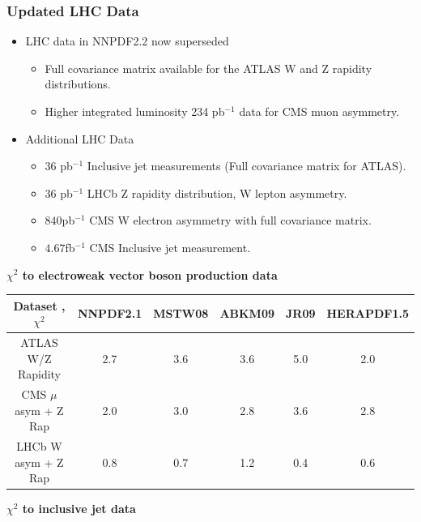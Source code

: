 \documentclass[10pt]{beamer}
\newcommand{\vso}{\vskip15pt}
\begin{document}
\begin{frame}
\frametitle{Updated LHC Data}
\begin{itemize}
\item<1-> LHC data in NNPDF2.2 now superseded
 \begin{itemize}
 \item<1-> Full covariance matrix available for the ATLAS W and Z rapidity distributions.
  \item<1-> Higher integrated luminosity 234 pb$^{-1}$ data for CMS muon asymmetry.
\end{itemize}
\end{itemize}

\begin{itemize}
\item<1-> Additional LHC Data
\begin{itemize}
\item<1-> $36$ pb$^{-1}$ Inclusive jet measurements (Full covariance matrix for ATLAS).
\item<1-> $36$ pb$^{-1}$ LHCb Z rapidity distribution, W lepton asymmetry. 
\item<1-> {\color{blue}$840$pb$^{-1}$ CMS  W electron asymmetry with full covariance matrix.}
\item<1-> {\color{blue}$4.67$fb$^{-1}$ CMS Inclusive jet measurement.}
\end{itemize}
\end{itemize}
\vso
\begin{centering}
\textbf { \footnotesize $\chi^2$ to electroweak vector boson production data}\\
\end{centering}
\begin{table}[h]
\scriptsize
\begin{center}
\begin{tabular}{|c|c|c|c|c|c|}
\hline
Dataset  , $\chi^2$ &  NNPDF2.1  &  MSTW08 & ABKM09  
& JR09 & HERAPDF1.5      \\  
\hline
\hline
ATLAS W/Z Rapidity  & 2.7    & 3.6 & 3.6 & 5.0 & 2.0\\
\hline
CMS $\mu$ asym  + Z Rap  & 2.0   & 3.0 & 2.8 & 3.6& 2.8\\  
\hline
LHCb W asym + Z Rap     & 0.8   & 0.7 & 1.2 & 0.4& 0.6\\
\hline
\end{tabular}
\end{center}
\end{table}
\begin{centering}
\textbf { \footnotesize $\chi^2$ to inclusive jet data}\\

\end{centering}
\end{frame}
\end{document}
